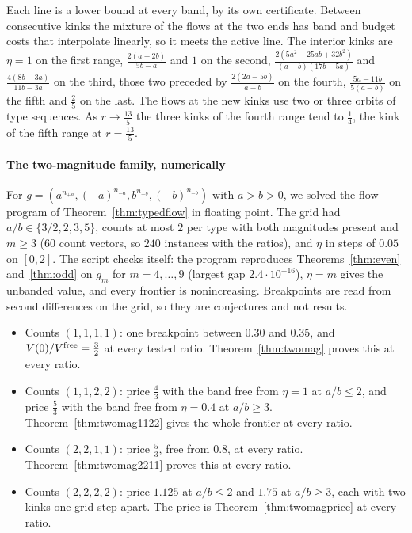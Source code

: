 Each line is a lower bound at every band, by its own certificate. Between consecutive kinks the
mixture of the flows at the two ends has band and budget costs that interpolate linearly, so it
meets the active line. The interior kinks are $\eta=1$ on the first range,
$\frac{2(a-2b)}{5b-a}$ and $1$ on the second, $\frac{2(5a^2-25ab+32b^2)}{(a-b)(17b-5a)}$ and $\frac{4(8b-3a)}{11b-3a}$ on the third, those two
preceded by $\frac{2(2a-5b)}{a-b}$ on the fourth, $\frac{5a-11b}{5(a-b)}$ on the fifth and $\frac25$ on
the last. The flows at the new kinks use two or three orbits of type sequences. As $r\to\frac{13}5$
the three kinks of the fourth range tend to $\frac14$, the kink of the fifth range at $r=\frac{13}5$.

\paragraph{The two-magnitude family, numerically}
For $g=(a^{n_{+a}},(-a)^{n_{-a}},b^{n_{+b}},(-b)^{n_{-b}})$ with $a>b>0$, we solved the flow
program of Theorem~\ref{thm:typedflow} in floating point. The grid had $a/b\in\{3/2,2,3,5\}$,
counts at most $2$ per type with both magnitudes present and $m\ge3$ ($60$ count vectors, so
$240$ instances with the ratios), and $\eta$ in steps of $0.05$ on
$[0,2]$. The script checks itself: the program reproduces Theorems~\ref{thm:even}
and~\ref{thm:odd} on $g_m$ for $m=4,\dots,9$ (largest gap $2.4\cdot10^{-16}$), $\eta=m$ gives the
unbanded value, and every frontier is nonincreasing. Breakpoints are read from second
differences on the grid, so they are conjectures and not results. \NUM{}
\begin{itemize}
\item Counts $(1,1,1,1)$: one breakpoint between $0.30$ and $0.35$, and
$V(0)/V^{\rm free}=\frac32$ at every tested ratio. Theorem~\ref{thm:twomag} proves this at
every ratio.
\item Counts $(1,1,2,2)$: price $\frac43$ with the band free from $\eta=1$ at $a/b\le2$, and
price $\frac53$ with the band free from $\eta=0.4$ at $a/b\ge3$. Theorem~\ref{thm:twomag1122} gives
the whole frontier at every ratio.
\item Counts $(2,2,1,1)$: price $\frac53$, free from $0.8$, at every ratio.
Theorem~\ref{thm:twomag2211} proves this at every ratio.
\item Counts $(2,2,2,2)$: price $1.125$ at $a/b\le2$ and $1.75$ at $a/b\ge3$, each with two
kinks one grid step apart. The price is Theorem~\ref{thm:twomagprice} at every ratio.
\end{itemize}
